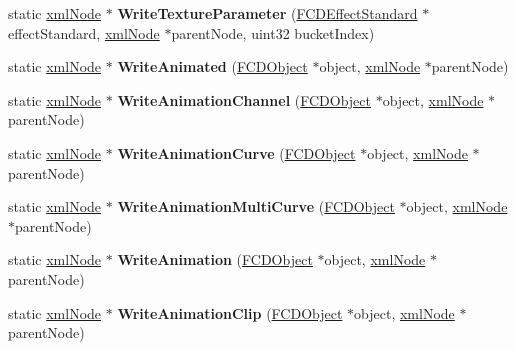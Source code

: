 \begin{DoxyCompactItemize}
\item 
\hypertarget{classFArchiveXML_a2d69a87ce64757bc1a4e37ba3ff01354}{
static \hyperlink{struct__xmlNode}{xmlNode} $\ast$ {\bfseries WriteTextureParameter} (\hyperlink{classFCDEffectStandard}{FCDEffectStandard} $\ast$effectStandard, \hyperlink{struct__xmlNode}{xmlNode} $\ast$parentNode, uint32 bucketIndex)}
\label{classFArchiveXML_a2d69a87ce64757bc1a4e37ba3ff01354}

\item 
\hypertarget{classFArchiveXML_a930d5526059c9dcf0a352546d9b0bcd2}{
static \hyperlink{struct__xmlNode}{xmlNode} $\ast$ {\bfseries WriteAnimated} (\hyperlink{classFCDObject}{FCDObject} $\ast$object, \hyperlink{struct__xmlNode}{xmlNode} $\ast$parentNode)}
\label{classFArchiveXML_a930d5526059c9dcf0a352546d9b0bcd2}

\item 
\hypertarget{classFArchiveXML_a00eb2534a16d63608d3d5fbc1ac404b6}{
static \hyperlink{struct__xmlNode}{xmlNode} $\ast$ {\bfseries WriteAnimationChannel} (\hyperlink{classFCDObject}{FCDObject} $\ast$object, \hyperlink{struct__xmlNode}{xmlNode} $\ast$parentNode)}
\label{classFArchiveXML_a00eb2534a16d63608d3d5fbc1ac404b6}

\item 
\hypertarget{classFArchiveXML_a49da485e530c6945ef1294686a205a4c}{
static \hyperlink{struct__xmlNode}{xmlNode} $\ast$ {\bfseries WriteAnimationCurve} (\hyperlink{classFCDObject}{FCDObject} $\ast$object, \hyperlink{struct__xmlNode}{xmlNode} $\ast$parentNode)}
\label{classFArchiveXML_a49da485e530c6945ef1294686a205a4c}

\item 
\hypertarget{classFArchiveXML_a0161f4f73928164672f0a7a04c770790}{
static \hyperlink{struct__xmlNode}{xmlNode} $\ast$ {\bfseries WriteAnimationMultiCurve} (\hyperlink{classFCDObject}{FCDObject} $\ast$object, \hyperlink{struct__xmlNode}{xmlNode} $\ast$parentNode)}
\label{classFArchiveXML_a0161f4f73928164672f0a7a04c770790}

\item 
\hypertarget{classFArchiveXML_ad25b81e2dfcf019623b24c371508ce7f}{
static \hyperlink{struct__xmlNode}{xmlNode} $\ast$ {\bfseries WriteAnimation} (\hyperlink{classFCDObject}{FCDObject} $\ast$object, \hyperlink{struct__xmlNode}{xmlNode} $\ast$parentNode)}
\label{classFArchiveXML_ad25b81e2dfcf019623b24c371508ce7f}

\item 
\hypertarget{classFArchiveXML_ad1cb7b03cf613abedcffd3aea4c1ab89}{
static \hyperlink{struct__xmlNode}{xmlNode} $\ast$ {\bfseries WriteAnimationClip} (\hyperlink{classFCDObject}{FCDObject} $\ast$object, \hyperlink{struct__xmlNode}{xmlNode} $\ast$parentNode)}
\label{classFArchiveXML_ad1cb7b03cf613abedcffd3aea4c1ab89}


\end{DoxyCompactItemize}
